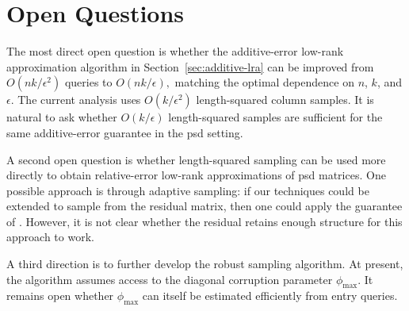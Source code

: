 

\section{Open Questions}

The most direct open question is whether the additive-error low-rank approximation algorithm in Section~\ref{sec:additive-lra} can be improved from
\(
    O\!({nk}/{\epsilon^2})
\)
queries to
\(
    O\!\left({nk}/{\epsilon}\right),
\)
matching the optimal dependence on $n$, $k$, and $\epsilon$. The current analysis uses $O(k/\epsilon^2)$ length-squared column samples. It is natural to ask whether $O(k/\epsilon)$ length-squared samples are sufficient for the same additive-error guarantee in the psd setting.

A second open question is whether length-squared sampling can be used more directly to obtain relative-error low-rank approximations of psd matrices. One possible approach is through adaptive sampling: if our techniques could be extended to sample from the residual matrix, then one could apply the guarantee of \cite{deshpande_adaptive_2006}. However, it is not clear whether the residual retains enough structure for this approach to work.

A third direction is to further develop the robust sampling algorithm. At present, the algorithm assumes access to the diagonal corruption parameter $\phi_{\max}$. It remains open whether $\phi_{\max}$ can itself be estimated efficiently from entry queries.
